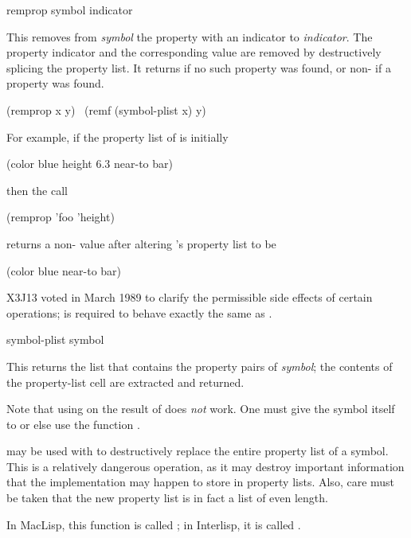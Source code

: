 \begin{defun}[Function]
remprop symbol indicator

This removes from {\it symbol} the property with an indicator 
to {\it indicator}.  The property indicator and the corresponding
value are removed by destructively splicing the property
list.  It returns {\false} if no such property was found,
or non-{\false} if a property was found.
\begin{lisp}
(remprop x y) \EQ\ (remf (symbol-plist x) y)
\end{lisp}
For example, if the property list of  is initially
\begin{lisp}
(color blue height 6.3 near-to bar)
\end{lisp}
then the call
\begin{lisp}
(remprop 'foo 'height)
\end{lisp}
returns a non-{\nil} value after altering 's property list to be
\begin{lisp}
(color blue near-to bar)
\end{lisp}

\begin{newer}
X3J13 voted in March 1989 
to clarify the permissible side effects of certain operations;
is required to behave exactly the same as
.
\end{newer}
\end{defun}

\begin{defun}[Function]
symbol-plist symbol

This returns the list that contains the property pairs of {\it symbol};
the contents of the property-list cell are extracted and returned.

Note that using  on the result of  does {\it not} work.
One must give the symbol itself to  or else
use the function .

 may be used with  to destructively replace
the entire property list of a symbol.  This is a relatively dangerous
operation, as it may destroy important information that
the implementation may happen to store in property lists.
Also, care must be taken that the new
property list is in fact a list of even length.
\beforenoterule
\begin{incompatibility}
In MacLisp, this function is called ;
in Interlisp, it is called .
\end{incompatibility}
\afternoterule
\end{defun}

